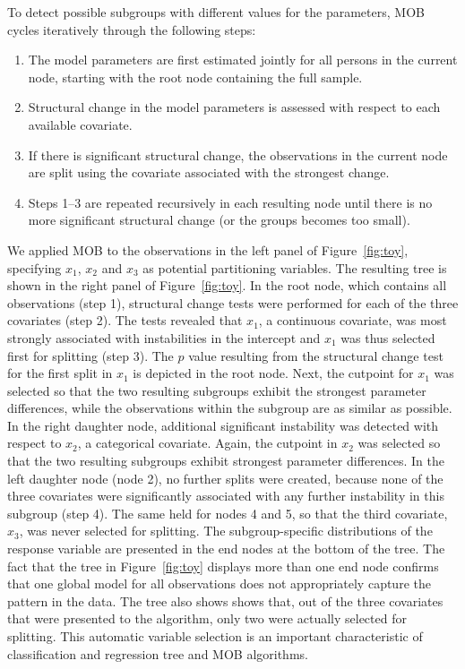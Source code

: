 \documentclass[doc,floatsintext,natbib]{apa7}
\begin{document}
To detect possible subgroups with different values for the parameters, MOB cycles iteratively through the following steps:

\begin{enumerate}
\setlength\itemsep{0.25em}
\item The model parameters are first estimated jointly for all persons in the current node, starting with the root node containing the full sample.
\item Structural change in the model parameters is assessed with respect to each available covariate.
\item If there is significant structural change, the observations in the current node are split using the covariate associated with the strongest change.
\item Steps 1--3 are repeated recursively in each resulting node until there is no more significant structural change (or the groups becomes too small).
\end{enumerate}

We applied MOB to the observations in the left panel of Figure~\ref{fig:toy}, specifying $x_1$, $x_2$ and $x_3$ as potential partitioning variables. The resulting tree is shown in the right panel of Figure~\ref{fig:toy}. In the root node, which contains all observations (step 1), structural change tests were performed for each of the three covariates (step 2). The tests revealed that $x_1$, a continuous covariate, was most strongly associated with instabilities in the intercept and $x_1$ was thus selected first for splitting (step 3). The $p$ value resulting from the structural change test for the first split in $x_1$ is depicted in the root node. Next, the cutpoint for $x_1$ was selected so that the two resulting subgroups exhibit the strongest parameter differences, while the observations within the subgroup are as similar as possible. In the right daughter node, additional significant instability was detected with respect to $x_2$, a categorical covariate. Again, the cutpoint in $x_2$ was selected so that the two resulting subgroups exhibit strongest parameter differences. In the left daughter node (node 2), no further splits were created, because none of the three covariates were significantly associated with any further instability in this subgroup (step 4). The same held for nodes 4 and 5, so that the third covariate, $x_3$, was never selected for splitting. The subgroup-specific distributions of the response variable are presented in the end nodes at the bottom of the tree.
The fact that the tree in Figure~\ref{fig:toy} displays more than one end node confirms that one global model for all observations does not appropriately capture the pattern in the data. 
The tree also shows shows that, out of the three covariates that were presented to the algorithm, only two were actually selected for splitting. This automatic variable selection is an important characteristic of classification and regression tree and MOB algorithms. 
\end{document}
